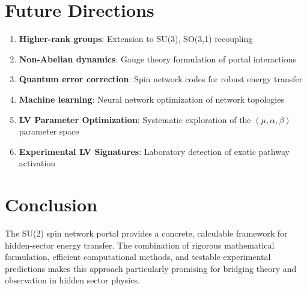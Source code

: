 \documentclass{article}
\begin{document}
\section{Future Directions}

\begin{enumerate}
\item \textbf{Higher-rank groups}: Extension to SU(3), SO(3,1) recoupling
\item \textbf{Non-Abelian dynamics}: Gauge theory formulation of portal interactions
\item \textbf{Quantum error correction}: Spin network codes for robust energy transfer
\item \textbf{Machine learning}: Neural network optimization of network topologies
\item \textbf{LV Parameter Optimization}: Systematic exploration of the $(\mu, \alpha, \beta)$ parameter space
\item \textbf{Experimental LV Signatures}: Laboratory detection of exotic pathway activation
\end{enumerate}

\section{Conclusion}

The SU(2) spin network portal provides a concrete, calculable framework for hidden-sector energy transfer. The combination of rigorous mathematical formulation, efficient computational methods, and testable experimental predictions makes this approach particularly promising for bridging theory and observation in hidden sector physics.
\end{document}
